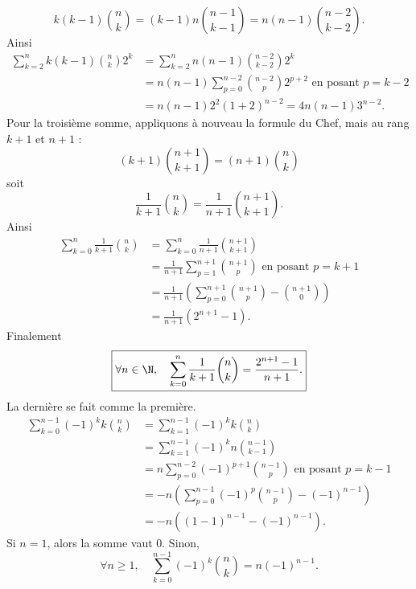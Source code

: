 {{\[ k(k-1)\binom{n}{k} = (k-1) n \binom{n-1}{k-1} = n(n-1)\binom{n-2}{k-2}.\]
Ainsi
\begin{align*}
\sum_{k=2}^n k(k-1)\binom{n}{k}2^k &= \sum_{k=2}^n n(n-1)\binom{n-2}{k-2}2^k\\
&= n(n-1) \sum_{p=0}^{n-2} \binom{n-2}{p}2^{p+2}	 \text{ en posant } p = k-2\\
&= n(n-1) 2^2 \left( 1+2\right)^{n-2} = 4n(n-1)3^{n-2}.
\end{align*}
Pour la troisième somme, appliquons à nouveau la formule du Chef, mais au rang $k+1$ et $n+1$ :
\[ (k+1)\binom{n+1}{k+1} = (n+1) \binom{n}{k}\]
soit
\[ \frac{1}{k+1}\binom{n}{k} = \frac{1}{n+1}\binom{n+1}{k+1}.\]
Ainsi
\begin{align*}
\sum_{k=0}^n\frac{1}{k+1}\binom{n}{k} &= \sum_{k=0}^n \frac{1}{n+1}\binom{n+1}{k+1}\\
&= \frac{1}{n+1} \sum_{p=1}^{n+1} \binom{n+1}{p} \text{ en posant } p=k+1\\
&= \frac{1}{n+1}\left(\sum_{p=0}^{n+1} \binom{n+1}{p} - \binom{n+1}{0}\right)\\
&= \frac{1}{n+1}\left( 2^{n+1} - 1\right).
\end{align*}
Finalement
\[ \boxed{\forall n\in \N,\quad \sum_{k=0}^n \frac{1}{k+1}\binom{n}{k} = \frac{2^{n+1}-1}{n+1}.}\]
La dernière se fait comme la première. 
\begin{align*}
\sum_{k=0}^{n-1} (-1)^kk\binom{n}{k} &= \sum_{k=1}^{n-1}	 (-1)^kk\binom{n}{k} \\
&= \sum_{k=1}^{n-1} (-1)^k n \binom{n-1}{k-1}\\
&= n \sum_{p=0}^{n-2} (-1)^{p+1} \binom{n-1}{p} \text{ en posant } p=k-1\\
&= -n \left( \sum_{p=0}^{n-1} (-1)^{p}\binom{n-1}{p} - (-1)^{n-1}\right)\\
&= -n \left( (1-1)^{n-1} - (-1)^{n-1}\right).
\end{align*}
Si $n=1$, alors la somme vaut $0$. Sinon, 
\[ \boxed{\forall n\geq 1,\quad \sum_{k=0}^{n-1} (-1)^k\binom{n}{k} = n(-1)^{n-1}.}\]}
}

